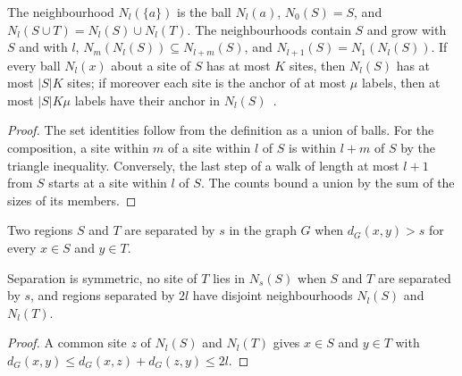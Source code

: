 \begin{lemma}
    \label{lem:dynamics_graph_neighborhood}
    \leanok
    The neighbourhood $N_l(\{a\})$ is the ball $N_l(a)$, $N_0(S)=S$, and
    $N_l(S\cup T)=N_l(S)\cup N_l(T)$. The neighbourhoods contain $S$ and grow
    with $S$ and with $l$, $N_m(N_l(S))\subseteq N_{l+m}(S)$, and
    $N_{l+1}(S)=N_1(N_l(S))$. If every
    ball $N_l(x)$ about a site of $S$ has at most $K$ sites, then $N_l(S)$ has
    at most $|S|K$ sites; if moreover each site is the anchor of at most $\mu$
    labels, then at most $|S|K\mu$ labels have their anchor in
    $N_l(S)$~\cite{OpenAI2026AreaLaw}.
\end{lemma}
\begin{proof}\leanok
    The set identities follow from the definition as a union of balls. For the
    composition, a site within $m$ of a site within $l$ of $S$ is within $l+m$
    of $S$ by the triangle inequality. Conversely, the last step of a walk of
    length at most $l+1$ from $S$ starts at a site within $l$ of $S$. The counts
    bound a union by the sum of the sizes of its members.
\end{proof}

\begin{definition}
    \label{def:dynamics_graph_separated}
    \leanok
    Two regions $S$ and $T$ are separated by $s$ in the graph $G$ when
    $d_G(x,y)>s$ for every $x\in S$ and $y\in T$.
\end{definition}

\begin{lemma}
    \label{lem:dynamics_graph_separated}
    \leanok
    Separation is symmetric, no site of $T$ lies in $N_s(S)$ when $S$ and $T$ are
    separated by $s$, and regions separated by $2l$ have disjoint neighbourhoods
    $N_l(S)$ and $N_l(T)$.
\end{lemma}
\begin{proof}\leanok
    A common site $z$ of $N_l(S)$ and $N_l(T)$ gives $x\in S$ and $y\in T$ with
    $d_G(x,y)\le d_G(x,z)+d_G(z,y)\le 2l$.
\end{proof}

